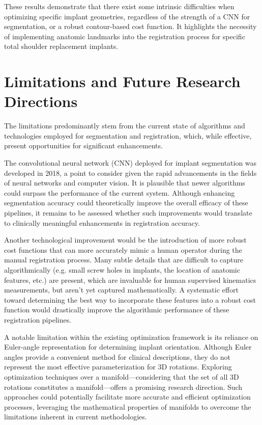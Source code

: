 These results demonstrate that there exist some intrinsic difficulties when optimizing specific implant geometries, regardless of the strength of a CNN for segmentation, or a robust contour-based cost function.
It highlights the necessity of implementing anatomic landmarks into the registration process for specific total shoulder replacement implants.


\section{Limitations and Future Research Directions}
The limitations predominantly stem from the current state of algorithms and technologies employed for segmentation and registration, which, while effective, present opportunities for significant enhancements.

The convolutional neural network (CNN) deployed for implant segmentation was developed in 2018, a point to consider given the rapid advancements in the fields of neural networks and computer vision.
It is plausible that newer algorithms could surpass the performance of the current system.
Although enhancing segmentation accuracy could theoretically improve the overall efficacy of these pipelines, it remains to be assessed whether such improvements would translate to clinically meaningful enhancements in registration accuracy.

Another technological improvement would be the introduction of more robust cost functions that can more accurately mimic a human operator during the manual registration process.
Many subtle details that are difficult to capture algorithmically (e.g. small screw holes in implants, the location of anatomic features, etc.) are present, which are invaluable for human supervised kinematics measurements, but aren't yet captured mathematically.
A systematic effort toward determining the best way to incorporate these features into a robust cost function would drastically improve the algorithmic performance of these registration pipelines.

A notable limitation within the existing optimization framework is its reliance on Euler-angle representation for determining implant orientation.
Although Euler angles provide a convenient method for clinical descriptions, they do not represent the most effective parameterization for 3D rotations.
Exploring optimization techniques over a manifold—considering that the set of all 3D rotations constitutes a manifold—offers a promising research direction.
Such approaches could potentially facilitate more accurate and efficient optimization processes, leveraging the mathematical properties of manifolds to overcome the limitations inherent in current methodologies.

